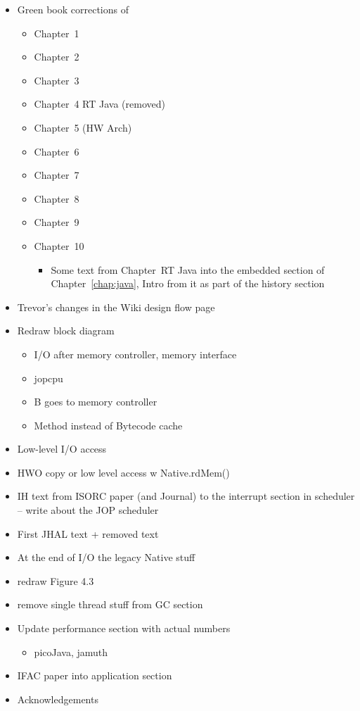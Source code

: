 \begin{itemize}
  \item Green book corrections of
  \begin{itemize}
    \item Chapter~1
    \item Chapter~2
    \item Chapter~3
    \item Chapter~4 RT Java (removed)
    \item Chapter~5 (HW Arch)
    \item Chapter~6
    \item Chapter~7
    \item Chapter~8
    \item Chapter~9
    \item Chapter~10
    \begin{itemize}
      \item Some text from Chapter~RT Java into the
          embedded section of Chapter~\ref{chap:java},
          Intro from it as part of the history section
    \end{itemize}
  \end{itemize}
    \item Trevor's changes in the Wiki design flow page
    \item Redraw block diagram
    \begin{itemize}
      \item I/O after memory controller, memory interface
      \item jopcpu
      \item B goes to memory controller
      \item Method instead of Bytecode cache
    \end{itemize}
    \item Low-level I/O access
    \item HWO copy or low level access w Native.rdMem()
    \item IH text from ISORC paper (and Journal) to the
        interrupt section in scheduler -- write about the JOP
        scheduler
    \item First JHAL text + removed text
    \item At the end of I/O the legacy Native stuff
    \item redraw Figure 4.3
    \item remove single thread stuff from GC section
    \item Update performance section with actual numbers
    \begin{itemize}
        \item picoJava, jamuth
    \end{itemize}
    \item IFAC paper into application section
    \item Acknowledgements
\end{itemize}

